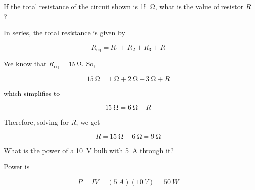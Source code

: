 \documentclass[answers]{exam}
\begin{document}
\begin{questions}
\question
If the total resistance of the circuit shown is \SI{15}{\ohm}, what is the value of resistor $R$?

\begin{center}
\end{center}

\begin{solutionorbox}[3.0cm]
In series, the total resistance is given by

\begin{equation*}
    R_\mathrm{eq} = R_1 + R_2 + R_3 + R
\end{equation*}

We know that $R_\mathrm{eq} = \SI{15}{\ohm}$. So,

\begin{equation*}
    \SI{15}{\ohm} = \SI{1}{\ohm} + \SI{2}{\ohm} + \SI{3}{\ohm} + R
\end{equation*}

which simplifies to

\begin{equation*}
    \SI{15}{\ohm} = \SI{6}{\ohm} + R
\end{equation*}

Therefore, solving for $R$, we get

\begin{equation*}
    R = \SI{15}{\ohm} - \SI{6}{\ohm} = \boxed{\SI{9}{\ohm}}
\end{equation*}
\end{solutionorbox}


\question
What is the power of a \SI{10}{V} bulb with \SI{5}{A} through it?

\begin{solutionorbox}[2.5cm]
Power is

\begin{equation*}
    P = IV = (\SI{5}{A})(\SI{10}{V}) = \boxed{\SI{50}{W}} 
\end{equation*}
\end{solutionorbox}


\end{questions}
\end{document}
